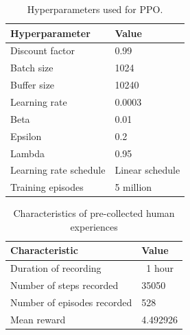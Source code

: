 \documentclass{article}
\begin{document}
\begin{table}[!tb]
\centering
\caption{Hyperparameters used for PPO.\label{tb:hyper}}
\begin{tabular}{l|l}
\toprule
\textbf{Hyperparameter} & \textbf{Value} \\
\hline
Discount factor & 0.99 \\
Batch size & 1024 \\
Buffer size & 10240 \\
Learning rate & 0.0003 \\
Beta & 0.01 \\
Epsilon & 0.2 \\
Lambda & 0.95 \\
Learning rate schedule & Linear schedule \\
Training episodes & 5 million\\
\bottomrule
\end{tabular}
\label{table:hyperparameters}
\end{table}

\begin{table}[!tb]
\centering
\caption{Characteristics of pre-collected human experiences}\label{table:human-experiences}
\begin{tabular}{l|l}
\toprule
\textbf{Characteristic} & \textbf{Value} \\
\hline
Duration of recording & ~1 hour \\
Number of steps recorded & 35050 \\
Number of episodes recorded & 528 \\
Mean reward & 4.492926 \\
\bottomrule
\end{tabular}
\end{table}
\end{document}
